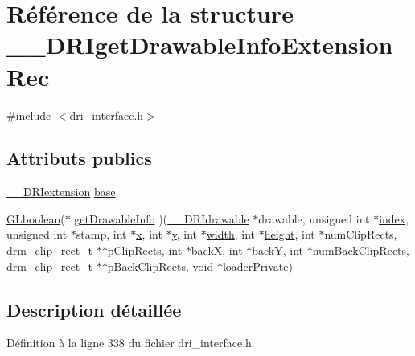 \hypertarget{struct_____d_r_iget_drawable_info_extension_rec}{\section{Référence de la structure \-\_\-\-\_\-\-D\-R\-Iget\-Drawable\-Info\-Extension\-Rec}
\label{struct_____d_r_iget_drawable_info_extension_rec}
}


{\ttfamily \#include $<$dri\-\_\-interface.\-h$>$}

\subsection*{Attributs publics}
\begin{DoxyCompactItemize}
\item 
\hyperlink{dri__interface_8h_a4e0a61c8ece00d2b2c6792a9a1b55385}{\-\_\-\-\_\-\-D\-R\-Iextension} \hyperlink{struct_____d_r_iget_drawable_info_extension_rec_a11af234206e5eb72327421399c8adb7a}{base}
\item 
\hyperlink{gl_8h_aea1419aa8aec5854bd9807b45171029d}{G\-Lboolean}($\ast$ \hyperlink{struct_____d_r_iget_drawable_info_extension_rec_ad238025cff673579d60b63f8fd572562}{get\-Drawable\-Info} )(\hyperlink{dri__interface_8h_a5bfb832a0a08208d95b3bbef439d2262}{\-\_\-\-\_\-\-D\-R\-Idrawable} $\ast$drawable, unsigned int $\ast$\hyperlink{glext_8h_a57f14e05b1900f16a2da82ade47d0c6d}{index}, unsigned int $\ast$stamp, int $\ast$\hyperlink{gl_8h_a0cdec8e97a75ee9458b23d152bf962d4}{x}, int $\ast$\hyperlink{gl_8h_a74d80fd479c0f6d0153c709949a089ef}{y}, int $\ast$\hyperlink{gl_8h_a30a197eaed803ac3cd1b444d4c972354}{width}, int $\ast$\hyperlink{gl_8h_aab021b2df174b06135ca6744356dcf34}{height}, int $\ast$num\-Clip\-Rects, drm\-\_\-clip\-\_\-rect\-\_\-t $\ast$$\ast$p\-Clip\-Rects, int $\ast$back\-X, int $\ast$back\-Y, int $\ast$num\-Back\-Clip\-Rects, drm\-\_\-clip\-\_\-rect\-\_\-t $\ast$$\ast$p\-Back\-Clip\-Rects, \hyperlink{glu_8h_a4292190e3f1f6b373a760c7d9316ad3c}{void} $\ast$loader\-Private)
\end{DoxyCompactItemize}


\subsection{Description détaillée}


Définition à la ligne 338 du fichier dri\-\_\-interface.\-h.



